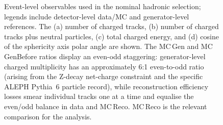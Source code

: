 
\begin{figure}[t!]
\centering
{}\hfill
{}
\vspace{0.5em}
\hfill
{}
\caption{Event-level observables used in the nominal hadronic selection; legends include detector-level data/MC and generator-level references. The (a) number of charged tracks, (b) number of charged tracks plus neutral particles, (c) total charged energy, and (d) cosine of the sphericity axis polar angle are shown. The MC\,Gen and MC\,GenBefore ratios display an even-odd staggering: generator-level charged multiplicity has an approximately 6:1 even-to-odd ratio (arising from the Z-decay net-charge constraint and the specific ALEPH Pythia~6 particle record), while reconstruction efficiency losses smear individual tracks one at a time and equalise the even/odd balance in data and MC\,Reco. MC\,Reco is the relevant comparison for the analysis.}
\label{fig:event_selection_observables}
\end{figure}

\FloatBarrier
